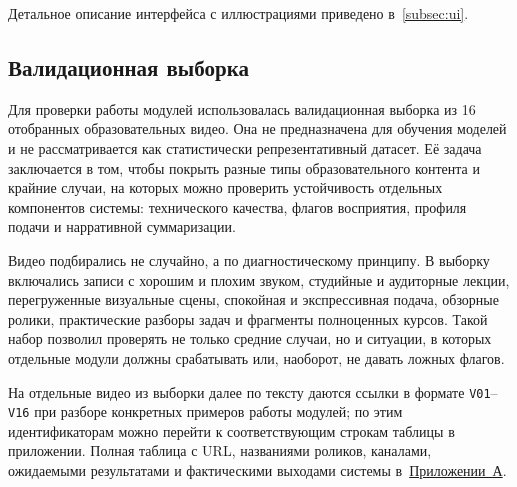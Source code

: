 Детальное описание интерфейса с иллюстрациями приведено
в~\cref{subsec:ui}.


\subsection{Валидационная выборка}
\label{subsec:validation-set}

Для проверки работы модулей использовалась валидационная выборка из 16 отобранных
образовательных видео. Она не предназначена для обучения моделей и не
рассматривается как статистически репрезентативный датасет. Её задача заключается в том, чтобы 
покрыть разные типы образовательного контента и крайние случаи, на которых
можно проверить устойчивость отдельных компонентов системы: технического
качества, флагов восприятия, профиля подачи и нарративной суммаризации.

Видео подбирались не случайно, а по диагностическому принципу. В выборку
включались записи с хорошим и плохим звуком, студийные и аудиторные лекции,
перегруженные визуальные сцены, спокойная и экспрессивная подача,
обзорные ролики, практические разборы задач и фрагменты полноценных курсов.
Такой набор позволил проверять не только средние случаи, но и ситуации,
в которых отдельные модули должны срабатывать или, наоборот, не давать
ложных флагов.

На отдельные видео из выборки далее по тексту даются ссылки в формате
\texttt{V01}--\texttt{V16} при разборе конкретных примеров работы модулей;
по этим идентификаторам можно перейти к соответствующим строкам таблицы
в приложении.
Полная таблица с URL, названиями
роликов, каналами, ожидаемыми результатами и фактическими выходами системы
в~\hyperref[appendix:validation-set]{Приложении~А}.